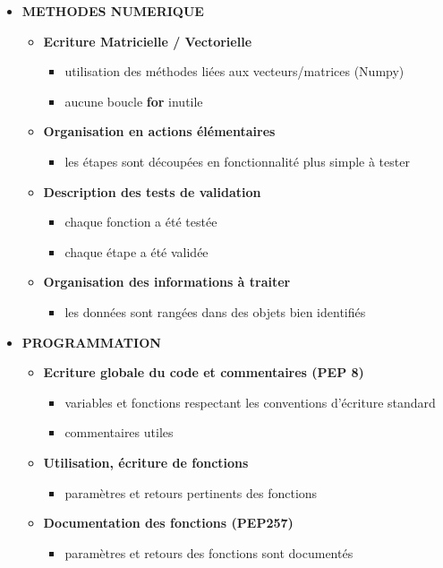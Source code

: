 \documentclass[10pt]{article} %
\begin{document}
\begin{itemize}
	\item \textbf{METHODES NUMERIQUE}
	\begin{itemize}
		\item \textbf{Ecriture Matricielle / Vectorielle}
		\begin{itemize}
			\item utilisation des méthodes liées aux vecteurs/matrices (Numpy)
			\item aucune boucle \textbf{for} inutile
		\end{itemize}		 
		\item \textbf{Organisation en actions élémentaires}
		\begin{itemize}
			\item les étapes sont découpées en fonctionnalité plus simple à tester
		\end{itemize}
		\item \textbf{Description des tests de validation}
		\begin{itemize}
			\item chaque fonction a été testée
			\item chaque étape a été validée
		\end{itemize}
		\item \textbf{Organisation des informations à traiter}
		\begin{itemize}
			\item les données sont rangées dans des objets bien identifiés
		\end{itemize}
	\end{itemize}


	\item \textbf{PROGRAMMATION}
	\begin{itemize}
		\item \textbf{Ecriture globale du code et commentaires (PEP 8)}
		\begin{itemize}
			\item variables et fonctions respectant les conventions d'écriture standard
			\item commentaires utiles
		\end{itemize}		 
		\item \textbf{Utilisation, écriture de fonctions}
		\begin{itemize}
			\item paramètres et retours pertinents des fonctions
		\end{itemize}
		\item \textbf{Documentation des fonctions (PEP257)}
		\begin{itemize}
			\item paramètres et retours des fonctions sont documentés
		\end{itemize}
	\end{itemize}
	


\end{itemize}
\end{document}
